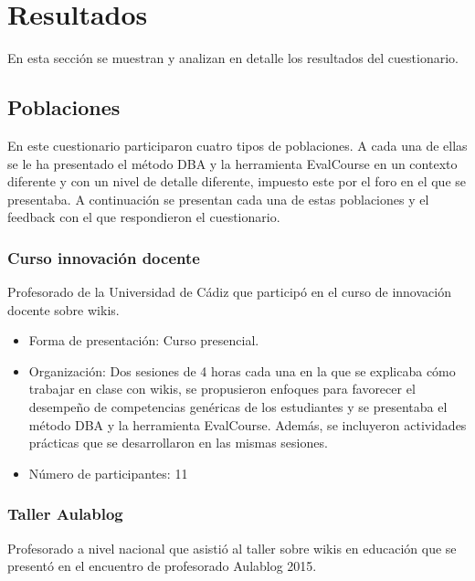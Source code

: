 \newpage

\section{Resultados} \label{apc:sec:resultados}

En esta sección se muestran y analizan en detalle los resultados del cuestionario. %

\subsection{Poblaciones}

En este cuestionario participaron cuatro tipos de poblaciones. A cada una de ellas se le ha presentado el método DBA y la herramienta EvalCourse en un contexto diferente y con un nivel de detalle diferente, impuesto este por el foro en el que se presentaba. A continuación se presentan cada una de estas poblaciones y el feedback con el que respondieron el cuestionario.

\subsubsection{Curso innovación docente}
Profesorado de la Universidad de Cádiz que participó en el curso de innovación docente sobre wikis.
	\begin{itemize}
		\item{Forma de presentación:} Curso presencial.

		\item{Organización:} Dos sesiones de 4 horas cada una en la que se explicaba cómo trabajar en clase con wikis, se propusieron enfoques para favorecer el desempeño de competencias genéricas de los estudiantes y se presentaba el método DBA y la herramienta EvalCourse.  Además, se incluyeron actividades prácticas que se desarrollaron en las mismas sesiones.

		\item{Número de participantes:} 11
	\end{itemize}

\subsubsection{Taller Aulablog}
Profesorado a nivel nacional que asistió al taller sobre wikis en educación que se presentó en el encuentro de profesorado Aulablog 2015.

